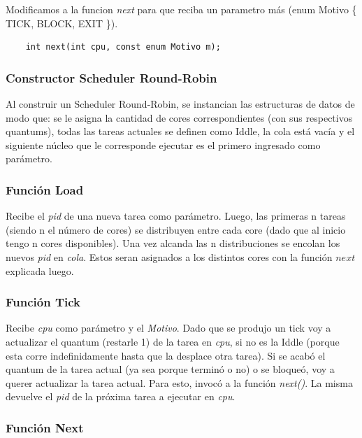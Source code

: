 \documentclass[a4paper]{article}
\begin{document}
\noindent  Modificamos a la funcion \emph{next} para que reciba un parametro m\'as (enum Motivo \{ TICK, BLOCK, EXIT \}).
	\begin{codesnippet}
	\begin{verbatim}
    int next(int cpu, const enum Motivo m);
	\end{verbatim}
	\end{codesnippet}
		
\subsubsection*{Constructor Scheduler Round-Robin}		

Al construir un Scheduler Round-Robin, se instancian las estructuras de datos de modo que: se le asigna la cantidad de cores correspondientes (con sus respectivos quantums), todas las tareas actuales se definen como Iddle, la cola est\'a vac\'ia y el siguiente n\'ucleo que le corresponde ejecutar es el primero ingresado como par\'ametro.

\subsubsection*{Funci\'on Load}

Recibe el \emph{pid} de una nueva tarea como par\'ametro. Luego, las primeras n tareas (siendo n el número de cores) se distribuyen entre cada core (dado que al inicio tengo n cores disponibles). Una vez alcanda las n distribuciones se encolan los nuevos \emph{pid} en \emph{cola}. Estos seran asignados a los distintos cores con la función $next$ explicada luego.

\subsubsection*{Funci\'on Tick}	

Recibe \emph{cpu} como par\'ametro y el \emph{Motivo}. Dado que se produjo un tick voy a actualizar el quantum (restarle 1) de la tarea en \emph{cpu}, si no es la Iddle (porque esta corre indefinidamente hasta que la desplace otra tarea). 
Si se acab\'o el quantum de la tarea actual (ya sea porque termin\'o o no) o se bloque\'o, voy a querer actualizar la tarea actual. Para esto, invocó a la funci\'on \emph{next()}. La misma devuelve el \emph{pid} de la próxima tarea a ejecutar en \emph{cpu}.

\subsubsection*{Funci\'on Next}	
	
\end{document}
